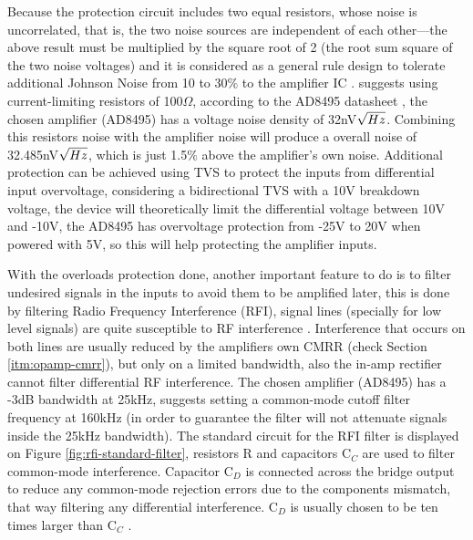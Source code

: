 	Because the protection circuit includes two equal resistors, whose noise is uncorrelated, that is, the two noise sources are independent of each other—the above result must be multiplied by the square root of 2 (the root sum square of the two noise voltages) and it is considered as a general rule design to tolerate additional Johnson Noise from 10 to 30$\%$ to the amplifier IC \cite{sensors2000}. \cite{two-ways-thermocouple} suggests using current-limiting resistors of 100$\Omega$, according to the AD8495 datasheet \cite{ad8495-datasheet}, the chosen amplifier (AD8495) has a voltage noise density of 32nV$\/ \sqrt{Hz}$. Combining this resistors noise with the amplifier noise will produce a overall noise of 32.485nV$\/\sqrt{Hz}$, which is just 1.5$\%$ above the amplifier's own noise. Additional protection can be achieved using TVS to protect the inputs from differential input overvoltage, considering a bidirectional TVS with a 10V breakdown voltage, the device will theoretically limit the differential voltage between 10V and -10V, the AD8495 has overvoltage protection from -25V to 20V when powered with 5V, so this will help protecting the amplifier inputs. 
	\par
	With the overloads protection done, another important feature to do is to filter undesired signals in the inputs to avoid them to be amplified later, this is done by filtering Radio Frequency Interference (RFI), signal lines (specially for low level signals) are quite susceptible to RF interference \cite{analogDevDesignersGuide}. Interference that occurs on both lines are usually reduced by the amplifiers own CMRR (check Section \ref{itm:opamp-cmrr}), but only on a limited bandwidth, also the in-amp rectifier cannot filter differential RF interference. The chosen amplifier (AD8495) has a -3dB bandwidth at 25kHz, \cite{two-ways-thermocouple} suggests setting a common-mode cutoff filter frequency at 160kHz (in order to guarantee the filter will not attenuate signals inside the 25kHz bandwidth). The standard circuit for the RFI filter is displayed on Figure \ref{fig:rfi-standard-filter}, resistors R and capacitors C$_{C}$ are used to filter common-mode interference. Capacitor C$_{D}$ is connected across the bridge output to reduce any common-mode rejection errors due to the components mismatch, that way filtering any differential interference. C$_{D}$ is usually chosen to be ten times larger than C$_{C}$ \cite{ad8495-datasheet}.
	
